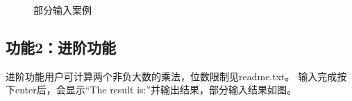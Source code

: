 \documentclass[a4paper, 11pt, UTF8]{ctexart}
\begin{document}
\begin{figure}[H]
    \centering
    \quad
    \quad
    \quad
    \caption{部分输入案例}
\end{figure}

\subsection{功能2：进阶功能}

进阶功能用户可计算两个非负大数的乘法，位数限制见readme.txt。
输入完成按下enter后，会显示“The result is:”并输出结果，部分输入结果如图。
\end{document}
